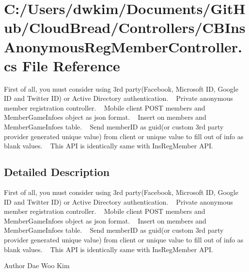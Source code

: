 \hypertarget{a00139}{}\section{C\+:/\+Users/dwkim/\+Documents/\+Git\+Hub/\+Cloud\+Bread/\+Controllers/\+C\+B\+Ins\+Anonymous\+Reg\+Member\+Controller.cs File Reference}
\label{a00139}


First of all, you must consider using 3rd party(\+Facebook, Microsoft I\+D, Google I\+D and Twitter I\+D) or Active Directory authentication. ~\newline
Private anonymous member registration controller. ~\newline
Mobile client P\+O\+ST members and Member\+Game\+Infoes object as json format. ~\newline
Insert on members and Member\+Game\+Infoes table. ~\newline
Send member\+ID as guid(or custom 3rd party provider generated unique value) from client or unique value to fill out of info as blank values. ~\newline
This A\+PI is identically same with Ins\+Reg\+Member A\+PI.  




\subsection{Detailed Description}
First of all, you must consider using 3rd party(\+Facebook, Microsoft I\+D, Google I\+D and Twitter I\+D) or Active Directory authentication. ~\newline
Private anonymous member registration controller. ~\newline
Mobile client P\+O\+ST members and Member\+Game\+Infoes object as json format. ~\newline
Insert on members and Member\+Game\+Infoes table. ~\newline
Send member\+ID as guid(or custom 3rd party provider generated unique value) from client or unique value to fill out of info as blank values. ~\newline
This A\+PI is identically same with Ins\+Reg\+Member A\+PI. 

\begin{DoxyAuthor}{Author}
Dae Woo Kim 
\end{DoxyAuthor}

